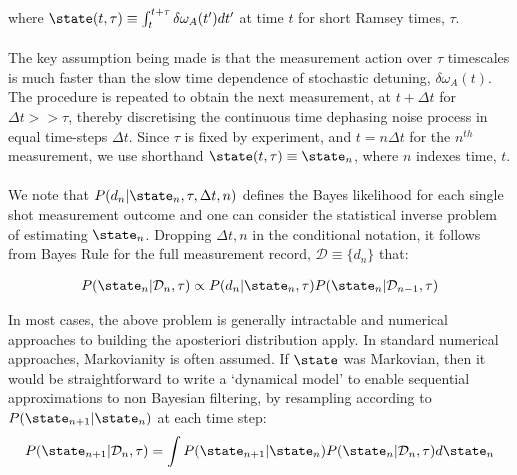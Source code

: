 where  $ \state(t,\tau) \equiv \int_{t}^{t+\tau} \delta \omega_A(t') dt'$ at time $t$ for short Ramsey times, $\tau$.
\\
\\
The key assumption being made is that the measurement action over $\tau$ timescales is much faster than the slow time dependence of stochastic detuning,  $\delta \omega_A(t)$. The procedure is repeated to obtain the next measurement, at $t + \Delta t$ for $\Delta t >> \tau$, thereby discretising the continuous time dephasing noise process in equal time-steps $\Delta t$. Since $\tau$ is fixed by experiment, and $t = n \Delta t$ for the $n^{th}$ measurement, we use shorthand $\state(t,\tau) \equiv \state_n$, where $n$ indexes time, $t$.
\\
\\
We note that $P(d_n | \state_n, \tau, \Delta t, n)$ defines the Bayes likelihood for each single shot measurement outcome and one can consider the statistical inverse problem of estimating $\state_n$. Dropping $\Delta t, n$ in the conditional notation, it follows from Bayes Rule for the full measurement record, $\mathcal{D} \equiv \{d_n\}$ that:

\begin{align}
P(\state_n| \mathcal{D}_n, \tau)  \propto P(d_n | \state_n, \tau) P(\state_n | \mathcal{D}_{n-1}, \tau)
\end{align}

In most cases, the above problem is generally intractable and numerical approaches to building the aposteriori distribution apply. In standard numerical approaches, Markovianity is often assumed. If $\state$ was Markovian, then it would be straightforward to write a `dynamical model' to enable sequential approximations to non Bayesian filtering, by resampling according to $P(\state_{n+1} | \state_n)$ at each time step:
\begin{align}
P(\state_{n+1} | \mathcal{D}_{n}, \tau) = \int P(\state_{n+1} | \state_n) P(\state_n | \mathcal{D}_{n}, \tau) d\state_n
\end{align}

